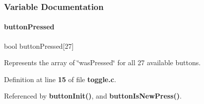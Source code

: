\subsubsection{Variable Documentation}
\mbox{\label{toggle_8c_a66c983ca3b3f041a4e293f814a41198f}} 
\paragraph{button\+Pressed}
{\footnotesize\ttfamily bool button\+Pressed[27]}

Represents the array of \char`\"{}was\+Pressed\char`\"{} for all 27 available buttons. 

Definition at line \textbf{ 15} of file \textbf{ toggle.\+c}.



Referenced by \textbf{ button\+Init()}, and \textbf{ button\+Is\+New\+Press()}.

